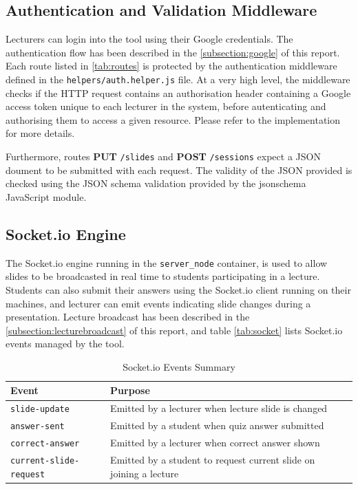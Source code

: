 \subsection{Authentication and Validation Middleware}
Lecturers can login into the tool using their Google credentials. The authentication
flow has been described in the \autoref{subsection:google} of this report. Each route
listed in \autoref{tab:routes} is protected by the authentication middleware defined
in the \texttt{helpers/auth.helper.js} file. At a very high level, the middleware
checks if the HTTP request contains an authorisation header containing a Google access
token unique to each lecturer in the system, before autenticating and authorising them
to access a given resource. Please refer to the implementation for more details.

Furthermore, routes \textbf{PUT} \texttt{/slides} and \textbf{POST} \texttt{/sessions} expect
a JSON doument to be submitted with each request. The validity of the JSON provided is
checked using the JSON schema validation provided by the jsonschema\cite{58} JavaScript module.

\subsection{Socket.io Engine}
The Socket.io engine running in the \texttt{server\_node} container, is used to allow slides to be broadcasted in real time to students
participating in a lecture. Students can also submit their answers using the
Socket.io client running on their machines, and lecturer can emit events indicating
slide changes during a presentation. Lecture broadcast has been described in the \autoref{subsection:lecturebroadcast}
of this report, and table \autoref{tab:socket} lists Socket.io events managed by the tool.

\begin{table}[h!]
\centering
\begin{tabular}{|l|l|l|}
\hline
\textbf{Event} & \textbf{Purpose} \\ \hline
\texttt{slide-update} & Emitted by a lecturer when lecture slide is changed \\ \hline
\texttt{answer-sent} & Emitted by a student when quiz answer submitted \\ \hline
\texttt{correct-answer} & Emitted by a lecturer when correct answer shown \\ \hline
\texttt{current-slide-request} & Emitted by a student to request current slide on joining a lecture \\ \hline
\end{tabular}
\caption{Socket.io Events Summary}
\label{tab:socket}
\end{table}

